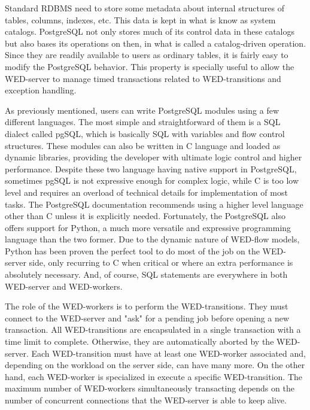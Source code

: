 \documentclass[12pt]{article}
\begin{document}
\par Standard RDBMS need to store some metadata about internal structures of tables, columns, indexes, etc. This data is kept in what is know as system catalogs. PostgreSQL not only stores much of its control data in these catalogs but also bases its operations on then, in what is called a catalog-driven operation. Since they are readily  available to users as ordinary tables, it is fairly easy to modify the PostgreSQL behavior. This property is specially useful to allow the WED-server to manage timed transactions related to WED-transitions and exception  handling. 

\par As previously mentioned, users can write PostgreSQL modules using a few different languages. The most simple and straightforward of them is a SQL dialect called pgSQL, which is basically SQL with variables and flow control structures. These modules can also be written in C language and loaded as dynamic libraries, providing the developer with ultimate logic control and higher performance. Despite  these two language having native support in PostgreSQL, sometimes pgSQL is not expressive enough for complex logic,
while C is too low level and requires an overload of technical details for implementation of  most tasks. The PostgreSQL documentation recommends using a higher level language other than C unless it is explicitly needed. Fortunately, the PostgreSQL also offers support for Python, a much more versatile and expressive programming language than the two former. Due to  the dynamic nature of WED-flow models, Python has been proven the perfect tool to do most of the job on the WED-server side, only recurring to C when critical or where an extra performance is absolutely necessary. And, of course, SQL statements are everywhere in both WED-server and WED-workers. 

\par The role of the WED-workers is to perform the WED-transitions. They must connect to the WED-server and "ask" for a pending job before opening a new transaction. All WED-transitions are encapsulated in a single transaction with a time limit to  complete. Otherwise, they are automatically aborted by the WED-server. Each WED-transition must have at least one WED-worker associated and, depending on the workload on the server side, can have many more. On the other hand, each WED-worker is  specialized in execute a specific WED-transition. The maximum number of WED-workers simultaneously transacting depends  on the number of concurrent connections that the WED-server is able to keep alive.
\end{document}
